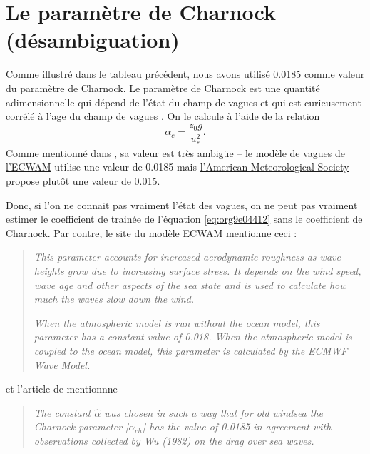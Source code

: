 \documentclass[10pt]{report}
\numberwithin{equation}{section}
\begin{document}
\section{Le paramètre de Charnock (désambiguation)}
\label{sec:org22b577e}
Comme illustré dans le tableau précédent, nous avons utilisé 0.0185 comme valeur du paramètre de Charnock.
Le paramètre de Charnock est une quantité adimensionnelle qui dépend de l'état du champ de vagues et qui est curieusement corrélé à l'age du champ de vagues \autocite[p.60]{janssen2004interaction}.
On le calcule à l'aide de la relation
\begin{equation}
   \alpha_c = \frac{z_0 g}{u_*^2}.
\end{equation}
Comme mentionné dans \Textcite{janssen2004interaction}, sa valeur est très ambigüe -- \href{https://codes.ecmwf.int/grib/param-db/148}{le modèle de vagues de l'ECWAM} utilise une valeur de 0.0185 mais \href{https://glossary.ametsoc.org/wiki/Charnock\%27s\_relation\#:\~:text=An\%20empirical\%20expression\%20for\%20aerodynamic,due\%20to\%20increasing\%20surface\%20stress.}{l'American Meteorological Society} propose plutôt une valeur de 0.015.\bigskip

Donc, si l'on ne connait pas vraiment l'état des vagues, on ne peut pas vraiment estimer le coefficient de trainée de l'équation \ref{eq:org9e04412} sans le coefficient de Charnock.
Par contre, le \href{https://codes.ecmwf.int/grib/param-db/148}{site du modèle ECWAM} mentionne ceci :

\begin{quote}
\emph{This parameter accounts for increased aerodynamic roughness as wave heights grow due to increasing surface stress. It depends on the wind speed, wave age and other aspects of the sea state and is used to calculate how much the waves slow down the wind.}

\emph{When the atmospheric model is run without the ocean model, this parameter has a constant value of 0.018. When the atmospheric model is coupled to the ocean model, this parameter is calculated by the ECMWF Wave Model.}
\end{quote}

et l'article de \Textcite[p.163]{janssen2004interaction} mentionnne

\begin{quote}
\emph{The constant \(\hat{\alpha}\) was chosen in such a way
that for old windsea the Charnock parameter [\(\alpha_{ch}\)] has the value of 0.0185 in
agreement with observations collected by Wu (1982) on the drag over sea
waves.}
\end{quote}
\end{document}

